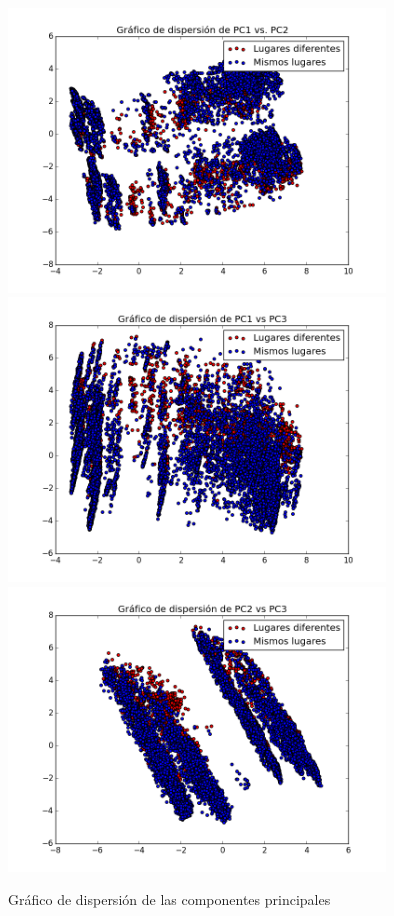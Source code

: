 \documentclass[journal]{IEEEtran}
\begin{document}
\begin{figure}[!ht]
\label{fig:pca_scatterplot}
\caption{Gráfico de dispersión de las componentes principales}
\centering
\includegraphics[width=10cm,keepaspectratio]{pca1_vs_pca2.png}
\includegraphics[width=10cm,keepaspectratio]{pca1_vs_pca3.png}
\includegraphics[width=10cm,keepaspectratio]{pca2_vs_pca3.png}
\end{figure}
\end{document}
